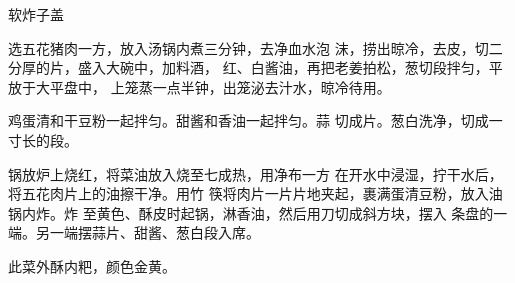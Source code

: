 \begin{recipe}{软炸子盖}

\ingredients


\cooking

\step 选五花猪肉一方，放入汤锅内煮三分钟，去净血水泡 沫，捞出晾冷，去皮，切二分厚的片，盛入大碗中，加料酒， 红、白酱油，再把老姜拍松，葱切段拌匀，平放于大平盘中， 上笼蒸一点半钟，出笼泌去汁水，晾冷待用。

\step 鸡蛋清和干豆粉一起拌匀。甜酱和香油一起拌匀。蒜 切成片。葱白洗净，切成一寸长的段。

\step 锅放炉上烧红，将菜油放入烧至七成热，用净布一方 在开水中浸湿，拧干水后，将五花肉片上的油擦干净。用竹 筷将肉片一片片地夹起，裹满蛋清豆粉，放入油锅内炸。炸 至黄色、酥皮时起锅，淋香油，然后用刀切成斜方块，摆入 条盘的一端。另一端摆蒜片、甜酱、葱白段入席。

\notes

此菜外酥内粑，颜色金黄。

\end{recipe}

